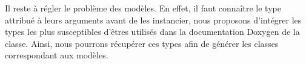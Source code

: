 \documentclass[11pt, french, screen]{report-rd-info}
\begin{document}
Il reste à régler le problème des modèles. En effet, il faut connaître le type attribué à leurs arguments avant de les instancier, nous proposons d'intégrer les types les plus susceptibles d'êtres utilisés dans la documentation Doxygen de la classe. Ainsi, nous pourrons récupérer ces types afin de générer les classes correspondant aux modèles.










\end{document}
